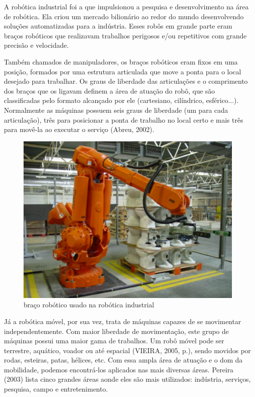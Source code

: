 A robótica industrial foi a que impulsionou a pesquisa e desenvolvimento na área de robótica. Ela criou um mercado bilionário ao redor do mundo desenvolvendo soluções automatizadas para a indústria. Esses robôs em grande parte eram braços robóticos que realizavam trabalhos perigosos e/ou repetitivos com grande precisão e velocidade. 

Também chamados de manipuladores, os braços robóticos eram fixos em uma posição, formados por uma estrutura articulada que move a ponta para o local desejado para trabalhar. Os graus de liberdade das articulações e o comprimento dos braços que os ligavam definem a área de atuação do robô, que são classificadas pelo formato alcançado por ele (cartesiano, cilíndrico, esférico...). Normalmente as máquinas possuem seis graus de liberdade (um para cada articulação), três para posicionar a ponta de trabalho no local certo e mais três para movê-la ao executar o serviço (Abreu, 2002).

\begin{figure}[h]
	\centering
	\label{fig01}
		\includegraphics[keepaspectratio=true,scale=0.6]{figuras/1bracorobotico.jpg}
	\caption{braço robótico usado na robótica industrial}
\end{figure}

Já a robótica móvel, por sua vez, trata de máquinas capazes de se movimentar independentemente. Com maior liberdade de movimentação, este grupo de máquinas possui uma maior gama de trabalhos. Um robô móvel pode ser terrestre, aquático, voador ou até espacial (VIEIRA, 2005, p.), sendo movidos por rodas, esteiras, patas, hélices, etc. Com essa ampla área de atuação e o dom da mobilidade, podemos encontrá-los aplicados nas mais diversas áreas. Pereira (2003) lista cinco grandes áreas aonde eles são mais utilizados: indústria, serviços, pesquisa, campo e entretenimento.

